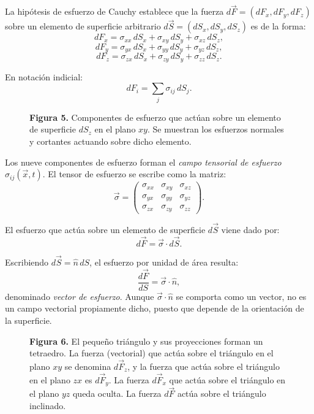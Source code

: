 La hipótesis de esfuerzo de Cauchy establece que la fuerza $d\vec{F} = (dF_x, dF_y, dF_z)$ sobre un elemento de superficie arbitrario $d\vec{S} = (dS_x, dS_y, dS_z)$ es de la forma:
$$ dF_x = \sigma_{xx}\,dS_x + \sigma_{xy}\,dS_y + \sigma_{xz}\,dS_z, $$
$$ dF_y = \sigma_{yx}\,dS_x + \sigma_{yy}\,dS_y + \sigma_{yz}\,dS_z, $$
$$ dF_z = \sigma_{zx}\,dS_x + \sigma_{zy}\,dS_y + \sigma_{zz}\,dS_z. $$

En notación indicial:
$$ dF_i = \sum_j \sigma_{ij}\,dS_j. $$

\begin{figure}[H]
\centering

\par\medskip
\textbf{Figura 5.} Componentes de esfuerzo que actúan sobre un elemento de superficie $dS_z$ en el plano $xy$. Se muestran los esfuerzos normales y cortantes actuando sobre dicho elemento.
\end{figure}

Los nueve componentes de esfuerzo forman el \emph{campo tensorial de esfuerzo} $\sigma_{ij}(\vec{x}, t)$. El tensor de esfuerzo se escribe como la matriz:
$$ \vec{\sigma} = \begin{pmatrix} \sigma_{xx} & \sigma_{xy} & \sigma_{xz} \\ \sigma_{yx} & \sigma_{yy} & \sigma_{yz} \\ \sigma_{zx} & \sigma_{zy} & \sigma_{zz} \end{pmatrix}. $$

El esfuerzo que actúa sobre un elemento de superficie $d\vec{S}$ viene dado por:
$$ d\vec{F} = \vec{\sigma} \cdot d\vec{S}. $$

Escribiendo $d\vec{S} = \hat{n}\,dS$, el esfuerzo por unidad de área resulta:
$$ \frac{d\vec{F}}{dS} = \vec{\sigma} \cdot \hat{n}, $$
denominado \emph{vector de esfuerzo}. Aunque $\vec{\sigma} \cdot \hat{n}$ se comporta como un vector, no es un campo vectorial propiamente dicho, puesto que depende de la orientación de la superficie.

\begin{figure}[H]
\centering

\par\medskip
\textbf{Figura 6.} El pequeño triángulo y sus proyecciones forman un tetraedro. La fuerza (vectorial) que actúa sobre el triángulo en el plano $xy$ se denomina $d\vec{F}_z$, y la fuerza que actúa sobre el triángulo en el plano $zx$ es $d\vec{F}_y$. La fuerza $d\vec{F}_x$ que actúa sobre el triángulo en el plano $yz$ queda oculta. La fuerza $d\vec{F}$ actúa sobre el triángulo inclinado.
\end{figure}

